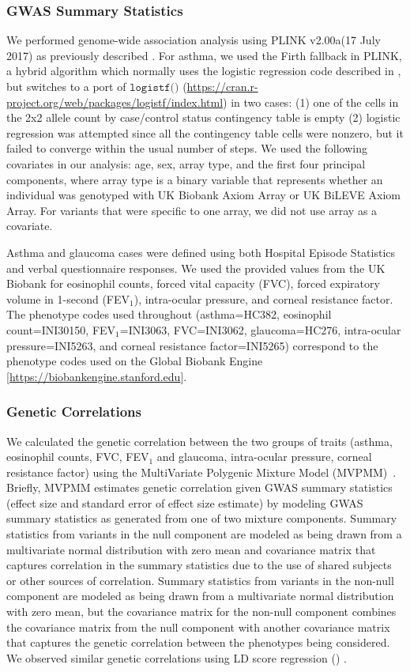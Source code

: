 \subsubsection*{GWAS Summary Statistics}
We performed genome-wide association analysis using PLINK v2.00a(17 July 2017) as previously described \cite{DeBoever179762}. For asthma, we used the Firth fallback in PLINK, a hybrid algorithm which normally uses the logistic regression code described in \cite{hill2017stepwise}, but switches to a port of $\texttt{logistf()}$ (\url{https://cran.r-project.org/web/packages/logistf/index.html}) in two cases: (1) one of the cells in the 2x2 allele count by case/control status contingency table is empty (2) logistic regression was attempted since all the contingency table cells were nonzero, but it failed to converge within the usual number of steps. We used the following covariates in our analysis: age, sex, array type, and the first four principal components, where array type is a binary variable that represents whether an individual was genotyped with UK Biobank Axiom Array or UK BiLEVE Axiom Array. For variants that were specific to one array, we did not use array as a covariate. 

Asthma and glaucoma cases were defined using both Hospital Episode Statistics and verbal questionnaire responses. We used the provided values from the UK Biobank for eosinophil counts, forced vital capacity (FVC), forced expiratory volume in 1-second (FEV$_1$), intra-ocular pressure, and corneal resistance factor. The phenotype codes used throughout (asthma=HC382, eosinophil count=INI30150, FEV$_1$=INI3063, FVC=INI3062, glaucoma=HC276, intra-ocular pressure=INI5263, and corneal resistance factor=INI5265) correspond to the phenotype codes used on the Global Biobank Engine [\url{https://biobankengine.stanford.edu}].

\subsubsection*{Genetic Correlations}
We calculated the genetic correlation between the two groups of traits (asthma, eosinophil counts, FVC, FEV$_1$ and glaucoma, intra-ocular pressure, corneal resistance factor) using the MultiVariate Polygenic Mixture Model (MVPMM)~\cite{DeBoever2017}. Briefly, MVPMM estimates genetic correlation given GWAS summary statistics (effect size and standard error of effect size estimate) by modeling GWAS summary statistics as generated from one of two mixture components. Summary statistics from variants in the null component are modeled as being drawn from a multivariate normal distribution with zero mean and covariance matrix that captures correlation in the summary statistics due to the use of shared subjects or other sources of correlation. Summary statistics from variants in the non-null component are modeled as being drawn from a multivariate normal distribution with zero mean, but the covariance matrix for the non-null component combines the covariance matrix from the null component with another covariance matrix that captures the genetic correlation between the phenotypes being considered. We observed similar genetic correlations using LD score regression () \cite{gencorr2015}.

